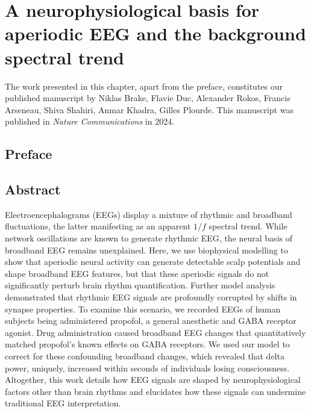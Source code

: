 \chapter{A neurophysiological basis for aperiodic EEG and the background spectral trend}
\label{sec:Tr1}

The work presented in this chapter, apart from the preface, constitutes our published manuscript  by Niklas Brake, Flavie Duc, Alexander Rokos, Francis Arseneau, Shiva Shahiri, Anmar Khadra, Gilles Plourde. This manuscript was published in \textit{Nature Communications} in 2024.

\section{Preface}


\newpage


\section{Abstract}
Electroencephalograms (EEGs) display a mixture of rhythmic and broadband fluctuations, the latter manifesting as an apparent $1/f$ spectral trend. While network oscillations are known to generate rhythmic EEG, the neural basis of broadband EEG remains unexplained. Here, we use biophysical modelling to show that aperiodic neural activity can generate detectable scalp potentials and shape broadband EEG features, but that these aperiodic signals do not significantly perturb brain rhythm quantification. Further model analysis demonstrated that rhythmic EEG signals are profoundly corrupted by shifts in synapse properties. To examine this scenario, we recorded EEGs of human subjects being administered propofol, a general anesthetic and GABA receptor agonist. Drug administration caused broadband EEG changes that quantitatively matched propofol’s known effects on GABA receptors. We used our model to correct for these confounding broadband changes, which revealed that delta power, uniquely, increased within seconds of individuals losing consciousness. Altogether, this work details how EEG signals are shaped by neurophysiological factors other than brain rhythms and elucidates how these signals can undermine traditional EEG interpretation.


